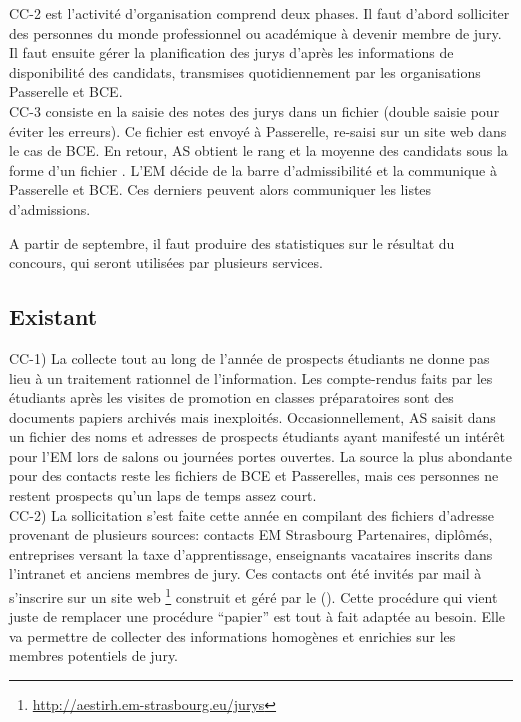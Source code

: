 \documentclass{book}
\begin{document}
CC-2  est  l'activité  d'organisation  comprend deux  phases.  Il  faut  d'abord
solliciter des personnes  du monde professionnel ou académique  à devenir membre
de  jury.  Il  faut  ensuite  gérer  la  planification  des  jurys  d'après  les
informations de disponibilité des  candidats, transmises quotidiennement par les
organisations Passerelle et BCE.\\

CC-3 consiste  en la saisie des  notes des jurys dans  un fichier 
(double saisie  pour éviter les  erreurs). Ce  fichier est envoyé  à Passerelle,
re-saisi sur un site  web dans le cas de BCE.  En retour,  AS obtient le rang et
la moyenne des candidats sous la  forme d'un fichier . L'EM décide
de la barre  d'admissibilité et la communique à Passerelle  et BCE. Ces derniers
peuvent alors communiquer les listes d'admissions.

A partir de septembre, il faut produire des statistiques sur le
résultat du concours, qui seront utilisées par plusieurs services.


\subsection{Existant}
CC-1) La collecte  tout au long de  l'année de prospects étudiants  ne donne pas
lieu à  un traitement rationnel  de l'information.  Les compte-rendus  faits par
les étudiants après  les visites de promotion en classes  préparatoires sont des
documents papiers  archivés mais inexploités. Occasionnellement,  AS saisit dans
un  fichier   des noms  et adresses  de prospects  étudiants ayant
manifesté un  intérêt pour l'EM lors  de salons ou journées  portes ouvertes. La
source  la  plus abondante  pour  des  contacts reste  les  fichiers  de BCE  et
Passerelles, mais ces  personnes ne restent prospects qu'un laps  de temps assez
court.\\


CC-2)  La  sollicitation s'est  faite  cette  année  en compilant  des  fichiers
d'adresse provenant  de plusieurs  sources: contacts EM  Strasbourg Partenaires,
diplômés, entreprises  versant la  taxe d'apprentissage,  enseignants vacataires
inscrits  dans l'intranet  et  anciens membres  de jury.  Ces  contacts ont  été
invités par mail à s'inscrire sur un site web%
\footnote{\url{http://aestirh.em-strasbourg.eu/jurys}} construit et  géré par le
\scom  (\NB).   Cette procédure  qui  vient  juste  de remplacer  une  procédure
``papier'' est tout à fait adaptée au besoin. Elle va permettre de collecter des
informations homogènes et enrichies sur les membres potentiels de jury.
\end{document}
